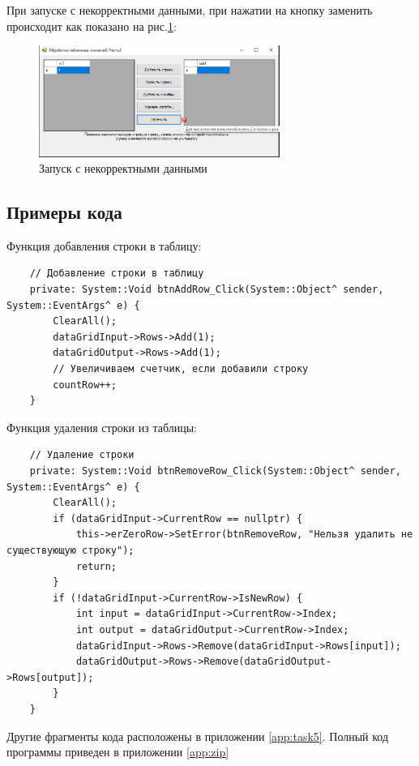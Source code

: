 При запуске с некорректными данными, при нажатии на кнопку заменить происходит  как показано на рис.\ref{fig:BadInputNotIntForm5}:

\begin{figure}[!h]
    \centering
    \includegraphics[width = 0.7\textwidth]{images/Task5/Try1RowChange.png}
    \caption{Запуск с некорректными данными}
    \label{fig:BadInputNotIntForm5}
\end{figure}

\subsection{Примеры кода}

Функция добавления строки в таблицу:

\begin{verbatim}
	// Добавление строки в таблицу
	private: System::Void btnAddRow_Click(System::Object^ sender, System::EventArgs^ e) {
		ClearAll();
		dataGridInput->Rows->Add(1);
		dataGridOutput->Rows->Add(1);
		// Увеличиваем счетчик, если добавили строку
		countRow++;
	}
\end{verbatim}

Функция удаления строки из таблицы:

\begin{verbatim}
	// Удаление строки
	private: System::Void btnRemoveRow_Click(System::Object^ sender, System::EventArgs^ e) {
		ClearAll();
		if (dataGridInput->CurrentRow == nullptr) {
			this->erZeroRow->SetError(btnRemoveRow, "Нельзя удалить не существующую строку");
			return;
		}
		if (!dataGridInput->CurrentRow->IsNewRow) {
			int input = dataGridInput->CurrentRow->Index;
			int output = dataGridOutput->CurrentRow->Index;
			dataGridInput->Rows->Remove(dataGridInput->Rows[input]);
			dataGridOutput->Rows->Remove(dataGridOutput->Rows[output]);
		}
	}
\end{verbatim}

Другие фрагменты кода расположены в приложении \ref{app:task5}. Полный код программы приведен в приложении \ref{app:zip}
